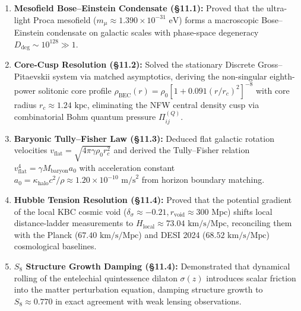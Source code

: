 \documentclass[
    12pt,
    a4paper,
    headings=normal,
    twoside=false,
    open=any,
    parskip=half
]{scrbook}
\begin{document}
\begin{tcolorbox}[colback=maincolor!3!white, colframe=maincolor!80!black, title={\textbf{Grand Synthesis of Chapter 11}}]
\begin{enumerate}[leftmargin=1.5em, itemsep=5pt]
    \item \textbf{Mesofield Bose--Einstein Condensate (§11.1):} Proved that the ultra-light Proca mesofield ($m_\mu \approx 1.390 \times 10^{-31}\text{ eV}$) forms a macroscopic Bose--Einstein condensate on galactic scales with phase-space degeneracy $D_{\text{deg}} \sim 10^{128} \gg 1$.
    \item \textbf{Core-Cusp Resolution (§11.2):} Solved the stationary Discrete Gross--Pitaevskii system via matched asymptotics, deriving the non-singular eighth-power solitonic core profile $\rho_{\text{BEC}}(r) = \rho_0 [1 + 0.091(r/r_c)^2]^{-8}$ with core radius $r_c \approx 1.24\text{ kpc}$, eliminating the NFW central density cusp via combinatorial Bohm quantum pressure $\Pi_{ij}^{(Q)}$.
    \item \textbf{Baryonic Tully--Fisher Law (§11.3):} Deduced flat galactic rotation velocities $v_{\text{flat}} = \sqrt{4\pi\gamma\rho_0 r_c^2}$ and derived the Tully--Fisher relation $v_{\text{flat}}^4 = \gamma M_{\text{baryon}} a_0$ with acceleration constant $a_0 = \kappa_{\text{halo}} c^2/\rho \approx 1.20 \times 10^{-10}\text{ m/s}^2$ from horizon boundary matching.
    \item \textbf{Hubble Tension Resolution (§11.4):} Proved that the potential gradient of the local KBC cosmic void ($\delta_\sigma \approx -0.21, r_{\text{void}} \approx 300\text{ Mpc}$) shifts local distance-ladder measurements to $H_{\text{local}} \approx 73.04\text{ km/s/Mpc}$, reconciling them with the Planck ($67.40\text{ km/s/Mpc}$) and DESI 2024 ($68.52\text{ km/s/Mpc}$) cosmological baselines.
    \item \textbf{$S_8$ Structure Growth Damping (§11.4):} Demonstrated that dynamical rolling of the entelechial quintessence dilaton $\sigma(z)$ introduces scalar friction into the matter perturbation equation, damping structure growth to $S_8 \approx 0.770$ in exact agreement with weak lensing observations.
\end{enumerate}
\end{tcolorbox}

\appendix
\end{document}

